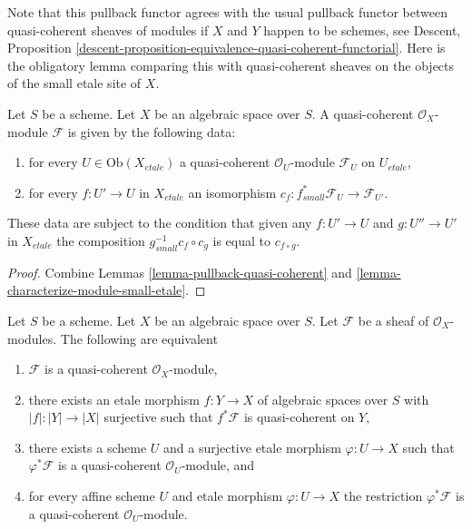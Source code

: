 \noindent
Note that this pullback functor agrees with the usual pullback functor
between quasi-coherent sheaves of modules if $X$ and $Y$ happen to be
schemes, see
Descent, Proposition
\ref{descent-proposition-equivalence-quasi-coherent-functorial}.
Here is the obligatory lemma comparing this with quasi-coherent sheaves
on the objects of the small etale site of $X$.

\begin{lemma}
\label{lemma-characterize-quasi-coherent-small-etale}
Let $S$ be a scheme. Let $X$ be an algebraic space over $S$.
A quasi-coherent $\mathcal{O}_X$-module $\mathcal{F}$
is given by the following data:
\begin{enumerate}
\item for every $U \in \text{Ob}(X_{etale})$ a quasi-coherent
$\mathcal{O}_U$-module $\mathcal{F}_U$ on $U_{etale}$,
\item for every $f : U' \to U$ in $X_{etale}$ an isomorphism
$c_f : f_{small}^*\mathcal{F}_U \to \mathcal{F}_{U'}$.
\end{enumerate}
These data are subject to the condition that given any $f : U' \to U$
and $g : U'' \to U'$ in $X_{etale}$ the composition
$g_{small}^{-1}c_f \circ c_g$ is equal to $c_{f \circ g}$.
\end{lemma}

\begin{proof}
Combine Lemmas \ref{lemma-pullback-quasi-coherent} and
\ref{lemma-characterize-module-small-etale}.
\end{proof}

\begin{lemma}
\label{lemma-characterize-quasi-coherent}
Let $S$ be a scheme. Let $X$ be an algebraic space over $S$.
Let $\mathcal{F}$ be a sheaf of $\mathcal{O}_X$-modules.
The following are equivalent
\begin{enumerate}
\item $\mathcal{F}$ is a quasi-coherent $\mathcal{O}_X$-module,
\item there exists an etale morphism $f : Y \to X$ of
algebraic spaces over $S$ with $|f| : |Y| \to |X|$ surjective
such that $f^*\mathcal{F}$ is quasi-coherent on $Y$,
\item there exists a scheme $U$ and a surjective etale morphism
$\varphi : U \to X$ such that $\varphi^*\mathcal{F}$ is a quasi-coherent
$\mathcal{O}_U$-module, and
\item for every affine scheme $U$ and etale morphism $\varphi : U \to X$ the
restriction $\varphi^*\mathcal{F}$ is a quasi-coherent $\mathcal{O}_U$-module.
\end{enumerate}
\end{lemma}

